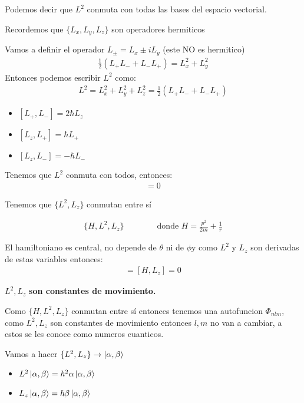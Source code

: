 \documentclass{article}
\begin{document}
Podemos decir que $ L^2  $ conmuta con todas las bases del espacio vectorial.

\hfill

Recordemos que $ \{L_x,L_y,L_z \} $ son operadores hermiticos

\hfill

Vamos a definir el operador $ L _{\pm } = L_x \pm i L_y  $ (este NO es hermitico)
\begin{gather*}
  \frac{1}{2} (L_+ L_- + L_- L_+ ) = L_x ^2 + L_y ^2 
\end{gather*}
Entonces podemos escribir $ L^2  $ como: 
\begin{gather*}
  L^2 = L_x^2 + L_y^2 + L_z^2 = \frac{1}{2} (L_+L_- + L_-L_+) 
\end{gather*}

\begin{itemize}
  \item $ [L_+, L_- ] = 2 \hbar L_z  $
  \item $ [L_z, L_+ ] = \hbar L_+  $ 
  \item $ [L_z, L_- ] = - \hbar L_- $
\end{itemize}

Tenemos que $ L^2  $ conmuta con todos, entonces: 
\begin{gather*}
  [L^2, L_\pm ] = 0 
\end{gather*}

Tenemos que $ \{L^2, L_z \} $ conmutan entre sí 

\begin{gather*}
  \{H, L^2 , L_z \} \qquad \qquad \text{donde }H = \frac{p^2 }{2m } + \frac{1}{r}
\end{gather*}

El hamiltoniano es central, no depende de $ \theta  $ ni de $ \phi  $y como $ L^2  $ y $ L_z  $ son derivadas de estas variables entonces:
\begin{gather*}
  [H, L^2 ] = [H,L_z ] = 0  
\end{gather*}

$ {L^2,L_z } $ \textbf{son constantes de movimiento.}

\hfill

Como $ \{H,L^2,L_z \} $ conmutan entre sí entonces tenemos una autofuncion $ \Phi _{nlm }  $, como $ L^2,L_z  $ son constantes de movimiento entonces $ l,m  $ no van a cambiar, a estos se les conoce como numeros cuanticos.

Vamos a hacer $ \{L^2, L_z \} \rightarrow \ket{\alpha, \beta} $
\begin{itemize}
  \item $ L^2 \ket{\alpha, \beta} = \hbar ^2 \alpha \ket{\alpha, \beta} $ 
  \item $ L_z \ket{\alpha, \beta} = \hbar \beta \ket{\alpha, \beta} $
\end{itemize}
\end{document}
